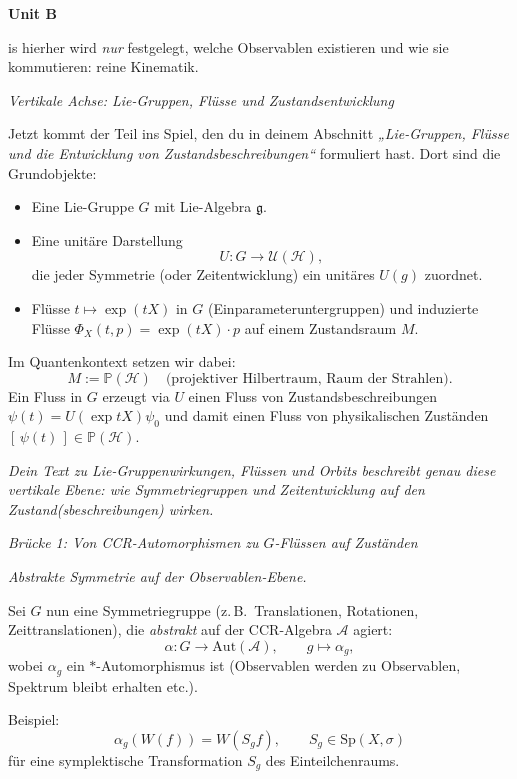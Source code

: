 \documentclass[10pt, letterpaper]{article}
\newenvironment{unit}[1]
  {\begin{unitbox}\textbf{Unit #1}\par\smallskip}
  {\end{unitbox}}
\begin{document}
\begin{unit}
Bis hierher wird \emph{nur} festgelegt, welche Observablen existieren und wie
sie kommutieren: reine Kinematik.

\emph{Vertikale Achse: Lie-Gruppen, Flüsse und Zustandsentwicklung}

Jetzt kommt der Teil ins Spiel, den du in deinem Abschnitt
\emph{„Lie-Gruppen, Flüsse und die Entwicklung von Zustandsbeschreibungen“}
formuliert hast. Dort sind die Grundobjekte:

\begin{itemize}
  \item Eine Lie-Gruppe \(G\) mit Lie-Algebra \(\mathfrak g\).
  \item Eine unitäre Darstellung
        \[
          U:G\to\mathcal{U}(\mathcal{H}),
        \]
        die jeder Symmetrie (oder Zeitentwicklung) ein unitäres \(U(g)\) zuordnet.
  \item Flüsse \(t\mapsto \exp(tX)\) in \(G\) (Einparameteruntergruppen)
        und induzierte Flüsse
        \(\Phi_X(t,p)=\exp(tX)\cdot p\) auf einem Zustandsraum \(M\).
\end{itemize}

Im Quantenkontext setzen wir dabei:
\[
M := \mathbb{P}(\mathcal{H})
\quad\text{(projektiver Hilbertraum, Raum der Strahlen)}.
\]
Ein Fluss in \(G\) erzeugt via \(U\) einen Fluss von Zustandsbeschreibungen
\(\psi(t)=U(\exp tX)\psi_0\) und damit einen Fluss von physikalischen Zuständen
\([\,\psi(t)\,]\in\mathbb{P}(\mathcal{H})\).

\emph{Dein Text zu Lie-Gruppenwirkungen, Flüssen und Orbits
beschreibt genau diese \emph{vertikale} Ebene:  
wie Symmetriegruppen und Zeitentwicklung auf den Zustand(sbeschreibungen)
wirken.}

\emph{Brücke 1: Von CCR-Automorphismen zu $G$-Flüssen auf Zuständen}

\emph{Abstrakte Symmetrie auf der Observablen-Ebene.}

Sei \(G\) nun eine Symmetriegruppe (z.\,B.\ Translationen, Rotationen,
Zeittranslationen), die \emph{abstrakt} auf der CCR-Algebra \(\mathcal{A}\)
agiert:
\[
\alpha: G\to\mathrm{Aut}(\mathcal{A}),
\qquad
g\mapsto\alpha_g,
\]
wobei \(\alpha_g\) ein $\ast$-Automorphismus ist (Observablen werden zu
Observablen, Spektrum bleibt erhalten etc.).

Beispiel:
\[
\alpha_g(W(f)) = W(S_g f),\qquad S_g\in\mathrm{Sp}(X,\sigma)
\]
für eine symplektische Transformation \(S_g\) des Einteilchenraums.


\end{unit}
\end{document}
